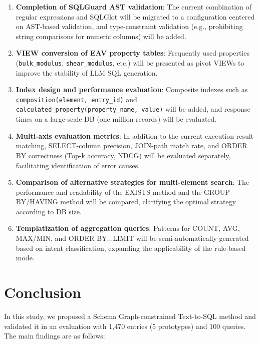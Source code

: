 \documentclass[5p,twocolumn]{elsarticle}
\begin{document}
\begin{enumerate}
    the computational performance of the Steiner tree approximation and SQL generation accuracy
    on more than 100{,}000 records and over 100 tables.
  \item \textbf{Completion of SQLGuard AST validation}:
    The current combination of regular expressions and SQLGlot will be migrated to a configuration centered on AST-based validation,
    and type-constraint validation (e.g., prohibiting string comparisons for numeric columns) will be added.
  \item \textbf{VIEW conversion of EAV property tables}:
    Frequently used properties (\texttt{bulk\_modulus}, \texttt{shear\_modulus}, etc.) will be
    presented as pivot VIEWs to improve the stability of LLM SQL generation.
  \item \textbf{Index design and performance evaluation}:
    Composite indexes such as \texttt{composition(element, entry\_id)}
    and \texttt{calculated\_property(property\_name, value)}
    will be added, and response times on a large-scale DB (one million records) will be evaluated.
  \item \textbf{Multi-axis evaluation metrics}:
    In addition to the current execution-result matching, SELECT-column precision, JOIN-path match rate,
    and ORDER BY correctness (Top-k accuracy, NDCG) will be evaluated separately,
    facilitating identification of error causes.
  \item \textbf{Comparison of alternative strategies for multi-element search}:
    The performance and readability of the EXISTS method and the GROUP BY/HAVING method will be compared,
    clarifying the optimal strategy according to DB size.
  \item \textbf{Templatization of aggregation queries}:
    Patterns for COUNT, AVG, MAX/MIN, and ORDER BY...LIMIT
    will be semi-automatically generated based on intent classification, expanding the applicability of the rule-based mode.
\end{enumerate}

\section{Conclusion}
\label{sec:conclusion}

In this study, we proposed a Schema Graph-constrained Text-to-SQL method
and validated it in an evaluation with 1{,}470 entries (5 prototypes) and 100 queries.
The main findings are as follows:
\end{document}
